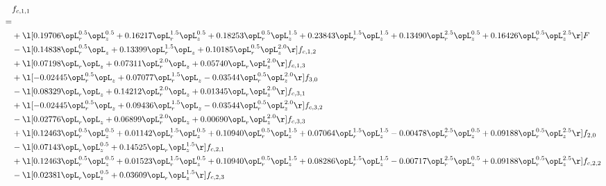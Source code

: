 \begin{alignat}{2} 
\label{eq:f_11_2} 
& f_{c,1,1} \nonumber \\ 
 = \\ 
& + \l[  0.19706 \opL_r^{0.5} \opL_z^{0.5} +  0.16217 \opL_r^{1.5} \opL_z^{0.5} +  0.18253 \opL_r^{0.5} \opL_z^{1.5} +  0.23843 \opL_r^{1.5} \opL_z^{1.5} +  0.13490 \opL_r^{2.5} \opL_z^{0.5} +  0.16426 \opL_r^{0.5} \opL_z^{2.5}  \r] F \nonumber \\ 
& - \l[  0.14838 \opL_r^{0.5} \opL_z +  0.13399 \opL_r^{1.5} \opL_z +  0.10185 \opL_r^{0.5} \opL_z^{2.0}  \r] f_{c,1,2} \nonumber \\ 
& + \l[  0.07198 \opL_r \opL_z +  0.07311 \opL_r^{2.0} \opL_z +  0.05740 \opL_r \opL_z^{2.0}  \r] f_{c,1,3} \nonumber \\ 
& + \l[  -0.02445 \opL_r^{0.5} \opL_z +  0.07077 \opL_r^{1.5} \opL_z   -0.03544 \opL_r^{0.5} \opL_z^{2.0}  \r] f_{3,0} \nonumber \\ 
& - \l[  0.08329 \opL_r \opL_z +  0.14212 \opL_r^{2.0} \opL_z +  0.01345 \opL_r \opL_z^{2.0}  \r] f_{c,3,1} \nonumber \\ 
& + \l[  -0.02445 \opL_r^{0.5} \opL_z +  0.09436 \opL_r^{1.5} \opL_z   -0.03544 \opL_r^{0.5} \opL_z^{2.0}  \r] f_{c,3,2} \nonumber \\ 
& - \l[  0.02776 \opL_r \opL_z +  0.06899 \opL_r^{2.0} \opL_z +  0.00690 \opL_r \opL_z^{2.0}  \r] f_{c,3,3} \nonumber \\ 
& + \l[  0.12463 \opL_r^{0.5} \opL_z^{0.5} +  0.01142 \opL_r^{1.5} \opL_z^{0.5} +  0.10940 \opL_r^{0.5} \opL_z^{1.5} +  0.07064 \opL_r^{1.5} \opL_z^{1.5}   -0.00478 \opL_r^{2.5} \opL_z^{0.5} +  0.09188 \opL_r^{0.5} \opL_z^{2.5}  \r] f_{2,0} \nonumber \\ 
& - \l[  0.07143 \opL_r \opL_z^{0.5} +  0.14525 \opL_r \opL_z^{1.5}  \r] f_{c,2,1} \nonumber \\ 
& + \l[  0.12463 \opL_r^{0.5} \opL_z^{0.5} +  0.01523 \opL_r^{1.5} \opL_z^{0.5} +  0.10940 \opL_r^{0.5} \opL_z^{1.5} +  0.08286 \opL_r^{1.5} \opL_z^{1.5}   -0.00717 \opL_r^{2.5} \opL_z^{0.5} +  0.09188 \opL_r^{0.5} \opL_z^{2.5}  \r] f_{c,2,2} \nonumber \\ 
& - \l[  0.02381 \opL_r \opL_z^{0.5} +  0.03609 \opL_r \opL_z^{1.5}  \r] f_{c,2,3} \nonumber \\ 
\end{alignat} 


